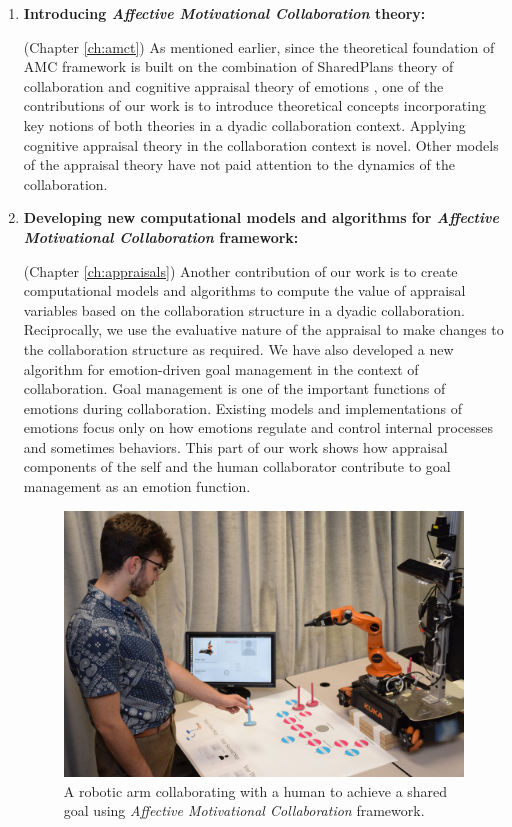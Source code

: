\documentclass[12pt]{report}
\begin{document}
\begin{enumerate}
  \item \textbf{Introducing \textit{Affective Motivational Collaboration}
  theory:}
    
  	(Chapter \ref{ch:amct}) As mentioned earlier, since the theoretical
  	foundation of AMC framework is built on the combination of SharedPlans
  	theory of collaboration \cite{grosz:plans-discourse} and cognitive appraisal
  	theory of emotions \cite{marsella:ema-process-model}
  	\cite{scherer:appraisal-processes}, one of the contributions of our work is
  	to introduce theoretical concepts incorporating key notions of both theories
  	in a dyadic collaboration context. Applying cognitive appraisal theory in the
  	collaboration context is novel. Other models of the appraisal theory have not
  	paid attention to the dynamics of the collaboration.
	
  \item \textbf{Developing new computational models and algorithms for
  \textit{Affective Motivational Collaboration} framework:}
  
	(Chapter \ref{ch:appraisals}) Another contribution of our work is to create
	computational models and algorithms to compute the value of appraisal variables
	based on the collaboration structure in a dyadic collaboration. Reciprocally,
	we use the evaluative nature of the appraisal to make changes to the
	collaboration structure as required. We have also developed a new algorithm for
	emotion-driven goal management in the context of collaboration. Goal management
	is one of the important functions of emotions during collaboration. Existing
	models and implementations of emotions focus only on how emotions regulate and
	control internal processes and sometimes behaviors. This part of our work shows
	how appraisal components of the self and the human collaborator contribute to
	goal management as an emotion function.
  
  \begin{figure}
    \centering
    \includegraphics[scale=1.17]{figure/collaborative-robot.png}
    \caption{A robotic arm collaborating with a human to achieve a shared goal
    using \textit{Affective Motivational Collaboration} framework.}
    \label{fig:collaborative-robot}
  \end{figure}
  

\end{enumerate}
\end{document}

